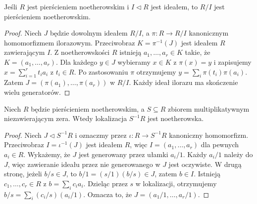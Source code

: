 \begin{twierdzenie}
\label{aa:tw:noether-quotients}
Jeśli $R$ jest pierścieniem noetherowskim i
$I\triangleleft R$ jest ideałem, to $R/I$ jest
pierścieniem noetherowskim.
\end{twierdzenie}
\begin{proof}
Niech $J$ będzie dowolnym ideałem $R/I$, a
$\pi:R\to R/I$ kanonicznym homomorfizmem ilorazowym.
Przeciwobraz $K=\pi^{-1}(J)$ jest ideałem $R$
zawierającym $I$. Z noetherowskości $R$ istnieją
$a_1,\ldots,a_r\in K$ takie, że $K=(a_1,\ldots,a_r)$.
Dla każdego $y\in J$ wybieramy $x\in K$ z $\pi(x)=y$
i zapisujemy $x=\sum_{i=1}^r t_ia_i$ z $t_i\in R$.
Po zastosowaniu $\pi$ otrzymujemy
$y=\sum_i\pi(t_i)\pi(a_i)$.
Zatem $J=(\pi(a_1),\ldots,\pi(a_r))$ w $R/I$.
Każdy ideał ilorazu ma skończenie wielu generatorów.
\end{proof}

\begin{twierdzenie}
\label{aa:tw:noether-localizations}
Niech $R$ będzie pierścieniem noetherowskim, a
$S\subseteq R$ zbiorem multiplikatywnym niezawierającym
zera. Wtedy lokalizacja $S^{-1}R$ jest noetherowska.
\end{twierdzenie}
\begin{proof}
Niech $J\triangleleft S^{-1}R$ i oznaczmy przez
$\iota:R\to S^{-1}R$ kanoniczny homomorfizm.
Przeciwobraz $I=\iota^{-1}(J)$ jest ideałem $R$,
więc $I=(a_1,\ldots,a_r)$ dla pewnych $a_i\in R$.
Wykażemy, że $J$ jest generowany przez ułamki $a_i/1$.
Każdy $a_i/1$ należy do $J$, więc zawieranie ideału
przez nie generowanego w $J$ jest oczywiste.
W drugą stronę, jeżeli $b/s\in J$, to
$b/1=(s/1)(b/s)\in J$, zatem $b\in I$.
Istnieją $c_1,\ldots,c_r\in R$ z
$b=\sum_i c_ia_i$. Dzieląc przez $s$ w lokalizacji,
otrzymujemy $b/s=\sum_i (c_i/s)(a_i/1)$.
Oznacza to, że $J=(a_1/1,\ldots,a_r/1)$.
\end{proof}

